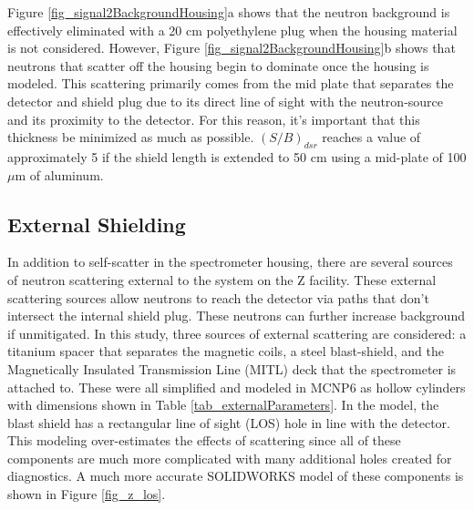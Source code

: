Figure \ref{fig_signal2BackgroundHousing}a shows that the neutron background is effectively eliminated with a 20 cm polyethylene plug when the housing material is not considered. However, Figure \ref{fig_signal2BackgroundHousing}b shows that neutrons that scatter off the housing begin to dominate once the housing is modeled. This scattering primarily comes from the mid plate that separates the detector and shield plug due to its direct line of sight with the neutron-source and its proximity to the detector. For this reason, it's important that this thickness be minimized as much as possible. $(S/B)_{dsr}$ reaches a value of approximately 5 if the shield length is extended to 50 cm using a mid-plate of 100 $\mu$m of aluminum. 

\subsection{External Shielding}

In addition to self-scatter in the spectrometer housing, there are several sources of neutron scattering external to the system on the Z facility. These external scattering sources allow neutrons to reach the detector via paths that don't intersect the internal shield plug. These neutrons can further increase background if unmitigated. In this study, three sources of external scattering are considered: a titanium spacer that separates the magnetic coils, a steel blast-shield, and the Magnetically Insulated Transmission Line (MITL) deck that the spectrometer is attached to. These were all simplified and modeled in MCNP6 as hollow cylinders with dimensions shown in Table \ref{tab_externalParameters}. In the model, the blast shield has a rectangular line of sight (LOS) hole in line with the detector. This modeling over-estimates the effects of scattering since all of these components are much more complicated with many additional holes created for diagnostics. A much more accurate SOLIDWORKS model of these components is shown in Figure \ref{fig_z_los}.  

